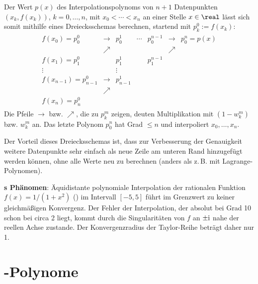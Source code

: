 Der Wert $p(x)$ des Interpolationspolynoms
von $n + 1$ Datenpunkten $(x_k, f(x_k))$, $k = 0, \dotsc, n$, mit $x_0 < \dotsb < x_n$
an einer Stelle $x \in \real$ lässt sich somit mithilfe eines Dreiecksschemas berechnen,
startend mit $p_k^0 := f(x_k)$:
\begin{align*}
    \begin{array}{ccccccc}
        f(x_0) = p_0^0 & \rightarrow & p_0^1 & \cdots & p_0^{n-1} & \rightarrow & p_0^n = p(x)\\
        & \nearrow & & & & \nearrow\\
        f(x_1) = p_1^0 & & p_1^1 & & p_1^{n-1}\\
        \vdots & & \vdots &\\
        f(x_{n-1}) = p_{n-1}^0 & \rightarrow & p_{n-1}^1\\
        & \nearrow\\
        f(x_n) = p_n^0
    \end{array}
\end{align*}
Die Pfeile $\rightarrow$ bzw. $\nearrow$, die zu $p_k^m$ zeigen,
deuten Multiplikation mit $(1 - w_k^m)$ bzw. $w_k^m$ an.
Das letzte Polynom $p_0^n$ hat Grad $\le n$ und interpoliert $x_0, \dotsc, x_n$.

Der Vorteil dieses Dreiecksschemas ist, dass zur Verbesserung der Genauigkeit
weitere Datenpunkte sehr einfach als neue Zeile am unteren Rand hinzugefügt
werden können, ohne alle Werte neu zu berechnen
(anders als z.\,B. mit Lagrange-Polynomen).

\linie

\textbf{s Phänomen}:
Äquidistante polynomiale Interpolation der rationalen Funktion $f(x) = 1/(1 + x^2)$
() im Intervall $[-5, 5]$ führt
im Grenzwert zu keiner gleichmäßigen Konvergenz.
Der Fehler der Interpolation, der absolut bei Grad 10 schon bei circa 2 liegt, kommt durch die
Singularitäten von $f$ an $\pm \mathrm{i}$ nahe der reellen Achse zustande.
Der Konvergenzradius der Taylor-Reihe beträgt daher nur 1.

\section{%
    -Polynome%
}

